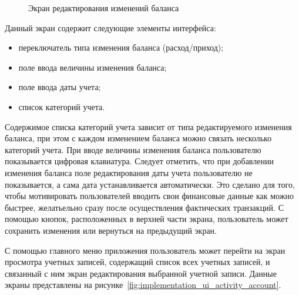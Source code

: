 \begin{figure}[h!]
  \centering
  \caption{Экран редактирования изменений баланса}
  \label{fig:implementation_ui_activity_input}
\end{figure}

Данный экран содержит следующие элементы интерфейса:
\begin{itemize}
\item переключатель типа изменения баланса (расход/приход);
\item поле ввода величины изменения баланса;
\item поле ввода даты учета;
\item список категорий учета.
\end{itemize}

Содержимое списка категорий учета зависит от типа редактируемого
изменения баланса, при этом с каждом изменением баланса можно связать несколько
категорий учета.
При вводе величины изменения баланса пользователю показывается цифровая клавиатура.
Следует отметить, что при добавлении изменения баланса поле редактирования
даты учета пользователю не показывается, а сама дата устанавливается автоматически.
Это сделано для того, чтобы мотивировать пользователей
вводить свои финансовые данные как можно быстрее,
желатьельно сразу после осуществления фактических транзакций.
С помощью кнопок, расположенных в верхней части экрана, пользователь
может сохранить изменения или вернуться на предыдущий экран.

С помощью главного меню приложения пользователь может перейти на
экран просмотра учетных записей, содержащий список всех учетных записей,
и связанный с ним экран редактирования выбранной учетной записи.
Данные экраны представлены на рисунке~\ref{fig:implementation_ui_activity_account}.

